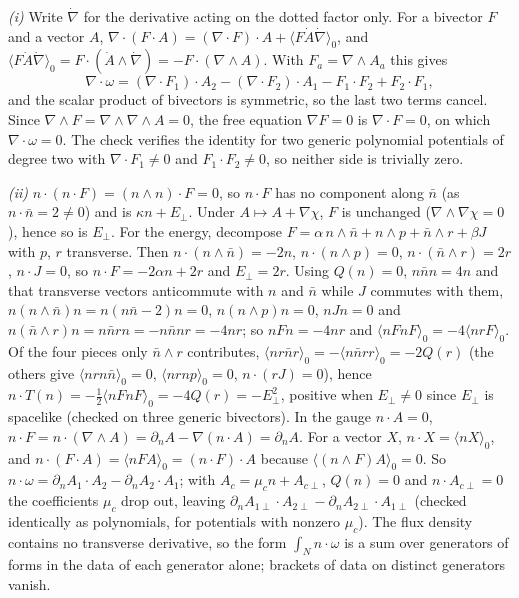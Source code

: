 \emph{(i)} Write $\dot\nabla$ for the derivative acting on the dotted factor only. For a bivector $F$ and a vector $A$, $\nabla\cdot(F\cdot A) = (\nabla\cdot F)\cdot A + \langle F\dot A\dot\nabla\rangle_{0}$, and $\langle F\dot A\dot\nabla\rangle_{0} = F\cdot(\dot A\wedge\dot\nabla) = -F\cdot(\nabla\wedge A)$. With $F_{a} = \nabla\wedge A_{a}$ this gives
\[
\nabla\cdot\omega = (\nabla\cdot F_{1})\cdot A_{2} - (\nabla\cdot F_{2})\cdot A_{1} - F_{1}\cdot F_{2} + F_{2}\cdot F_{1},
\]
and the scalar product of bivectors is symmetric, so the last two terms cancel. Since $\nabla\wedge F = \nabla\wedge\nabla\wedge A = 0$, the free equation $\nabla F = 0$ is $\nabla\cdot F = 0$, on which $\nabla\cdot\omega = 0$. The check verifies the identity for two generic polynomial potentials of degree two with $\nabla\cdot F_{1} \ne 0$ and $F_{1}\cdot F_{2} \ne 0$, so neither side is trivially zero.

\emph{(ii)} $n\cdot(n\cdot F) = (n\wedge n)\cdot F = 0$, so $n\cdot F$ has no component along $\bar n$ (as $n\cdot\bar n = 2 \ne 0$) and is $\kappa n + E_{\perp}$. Under $A \mapsto A + \nabla\chi$, $F$ is unchanged ($\nabla\wedge\nabla\chi = 0$), hence so is $E_{\perp}$. For the energy, decompose $F = \alpha\,n\wedge\bar n + n\wedge p + \bar n\wedge r + \beta J$ with $p$, $r$ transverse. Then $n\cdot(n\wedge\bar n) = -2n$, $n\cdot(n\wedge p) = 0$, $n\cdot(\bar n\wedge r) = 2r$, $n\cdot J = 0$, so $n\cdot F = -2\alpha n + 2r$ and $E_{\perp} = 2r$. Using $Q(n) = 0$, $n\bar nn = 4n$ and that transverse vectors anticommute with $n$ and $\bar n$ while $J$ commutes with them, $n(n\wedge\bar n)n = n(n\bar n - 2)n = 0$, $n(n\wedge p)n = 0$, $nJn = 0$ and $n(\bar n\wedge r)n = n\bar nrn = -n\bar nnr = -4nr$; so $nFn = -4nr$ and $\langle nFnF\rangle_{0} = -4\langle nrF\rangle_{0}$. Of the four pieces only $\bar n\wedge r$ contributes, $\langle nr\bar nr\rangle_{0} = -\langle n\bar nrr\rangle_{0} = -2Q(r)$ (the others give $\langle nrn\bar n\rangle_{0} = 0$, $\langle nrnp\rangle_{0} = 0$, $n\cdot(rJ) = 0$), hence $n\cdot T(n) = -\tfrac12\langle nFnF\rangle_{0} = -4Q(r) = -E_{\perp}^{2}$, positive when $E_{\perp} \ne 0$ since $E_{\perp}$ is spacelike (checked on three generic bivectors). In the gauge $n\cdot A = 0$, $n\cdot F = n\cdot(\nabla\wedge A) = \partial_{n}A - \nabla(n\cdot A) = \partial_{n}A$. For a vector $X$, $n\cdot X = \langle nX\rangle_{0}$, and $n\cdot(F\cdot A) = \langle nFA\rangle_{0} = (n\cdot F)\cdot A$ because $\langle (n\wedge F)A\rangle_{0} = 0$. So $n\cdot\omega = \partial_{n}A_{1}\cdot A_{2} - \partial_{n}A_{2}\cdot A_{1}$; with $A_{c} = \mu_{c}n + A_{c\perp}$, $Q(n) = 0$ and $n\cdot A_{c\perp} = 0$ the coefficients $\mu_{c}$ drop out, leaving $\partial_{n}A_{1\perp}\cdot A_{2\perp} - \partial_{n}A_{2\perp}\cdot A_{1\perp}$ (checked identically as polynomials, for potentials with nonzero $\mu_{c}$). The flux density contains no transverse derivative, so the form $\int_{N}n\cdot\omega$ is a sum over generators of forms in the data of each generator alone; brackets of data on distinct generators vanish.

